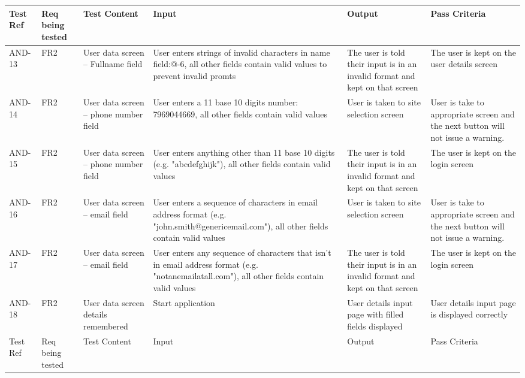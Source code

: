 \documentclass[10pt,a4paper]{article}
\begin{document}
\begin{center}
		\begin{tabular}{| p{1.5cm} | p{1.8cm} | p{3cm} | p{2cm} | p{3cm} | p{3cm} | }
		\hline
		\rowcolor{Blue}
		Test Ref & Req being tested & Test Content & Input & Output & Pass Criteria \\ \hline
		AND-13 & FR2 & User data screen – Fullname field & User enters strings of invalid characters in name field:@-6, all other fields contain valid values to prevent invalid promts & The user is told their input is in an invalid format and kept on that screen & The user is kept on the user details screen \\ \hline
		AND-14 & FR2 &  User data screen – phone number field & User enters a 11 base 10 digits number: 7969044669, all other fields contain valid values & User is taken to site selection screen & User is take to appropriate screen and the next button will not issue a warning. \\ \hline
		AND-15 & FR2 &  User data screen – phone number field & User enters anything other than 11 base 10 digits (e.g. "abcdefghijk"), all other fields contain valid values & The user is told their input is in an invalid format and kept on that screen & The user is kept on the login screen \\ \hline
		AND-16 & FR2 &  User data screen – email field & User enters a sequence of characters in email address format (e.g. "john.smith@genericemail.com"), all other fields contain valid values  & User is taken to site selection screen & User is take to appropriate screen and the next button will not issue a warning. \\ \hline
		AND-17 & FR2 &  User data screen – email field & User enters any sequence of characters that isn't in email address format (e.g. "notanemailatall.com"), all other fields contain valid values & The user is told their input is in an invalid format and kept on that screen & The user is kept on the login screen \\ \hline
		AND-18 & FR2 & User data screen details remembered & Start application & User details input page with filled fields displayed & User details input page is displayed correctly \\ \hline
		\hline
		\rowcolor{Blue}
		Test Ref & Req being tested & Test Content & Input & Output & Pass Criteria \\ \hline
	\end{tabular}
	
\end{center}
\end{document}
